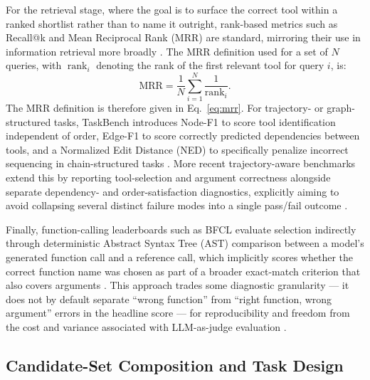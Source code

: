 \documentclass[acmsmall]{acmart}
\begin{document}
For the retrieval stage, where the goal is to surface the correct tool within a ranked shortlist rather than to name it outright, rank-based metrics such as Recall@k and Mean Reciprocal Rank (MRR) are standard, mirroring their use in information retrieval more broadly \citep{mohammadi2025evaluation,shi2025toolretrieval}. The MRR definition used for a set of $N$ queries, with $\operatorname{rank}_i$ denoting the rank of the first relevant tool for query $i$, is:
\begin{equation}
\mathrm{MRR} = \frac{1}{N}\sum_{i=1}^{N}\frac{1}{\operatorname{rank}_i}.
\label{eq:mrr}
\end{equation}
The MRR definition is therefore given in Eq.~\eqref{eq:mrr}. For trajectory- or graph-structured tasks, TaskBench introduces Node-F1 to score tool identification independent of order, Edge-F1 to score correctly predicted dependencies between tools, and a Normalized Edit Distance (NED) to specifically penalize incorrect sequencing in chain-structured tasks \citep{shen2023taskbench}. More recent trajectory-aware benchmarks extend this by reporting tool-selection and argument correctness alongside separate dependency- and order-satisfaction diagnostics, explicitly aiming to avoid collapsing several distinct failure modes into a single pass/fail outcome \citep{he2025trajectbench}.

Finally, function-calling leaderboards such as BFCL evaluate selection indirectly through deterministic Abstract Syntax Tree (AST) comparison between a model's generated function call and a reference call, which implicitly scores whether the correct function name was chosen as part of a broader exact-match criterion that also covers arguments \citep{patil2025bfcl}. This approach trades some diagnostic granularity --- it does not by default separate ``wrong function'' from ``right function, wrong argument'' errors in the headline score --- for reproducibility and freedom from the cost and variance associated with LLM-as-judge evaluation \citep{patil2025bfcl}.

\subsection{Candidate-Set Composition and Task Design}
\label{sec:candidates}
\end{document}
